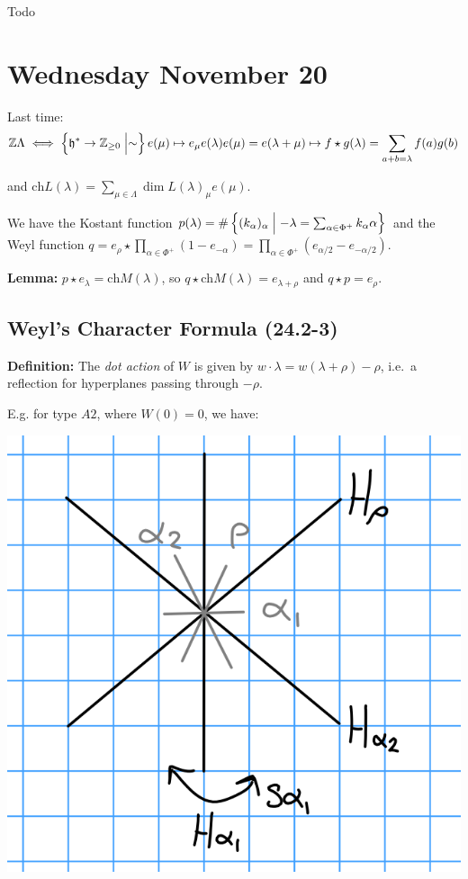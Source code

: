 Todo

\hypertarget{wednesday-november-20}{%
\section{Wednesday November 20}\label{wednesday-november-20}}

Last time: \[
{\mathbb{Z}} \Lambda \iff \left\{{ {\mathfrak{h}}^* \to {\mathbb{Z}}_{\geq 0} \mathrel{\Big|} \sim  }\right\} \\
e(\mu) \mapsto e_\mu \\
e(\lambda) e(\mu) = e(\lambda + \mu) \mapsto f \star g(\lambda) = \sum_{a+b=\lambda} f(a) g(b)
\]

and
\(\mathrm{ch} L(\lambda) = \sum_{\mu \in \Lambda} \dim L(\lambda)_\mu e(\mu)\).

We have the Kostant function
\(p(\lambda) = \# \left\{{ (k_\alpha)_\alpha \mathrel{\Big|} -\lambda = \sum_{\alpha\in\Phi^+} k_\alpha \alpha }\right\}\)
and the Weyl function
\(q = e_\rho \star \prod_{\alpha\in\Phi^+}(1 - e_{-\alpha}) = \prod_{\alpha\in\Phi^+} (e_{\alpha/2} - e_{-\alpha/2})\).

\textbf{Lemma:} \(p\star e_\lambda = \mathrm{ch} M(\lambda)\), so
\(q \star \mathrm{ch} M(\lambda) = e_{\lambda + \rho}\) and
\(q \star p = e_\rho\).

\hypertarget{weyls-character-formula-24.2-3}{%
\subsection{Weyl's Character Formula
(24.2-3)}\label{weyls-character-formula-24.2-3}}

\textbf{Definition:} The \emph{dot action} of \(W\) is given by
\(w\cdot \lambda = w(\lambda + \rho) - \rho\), i.e.~a reflection for
hyperplanes passing through \(-\rho\).

E.g. for type \(A2\), where \(W(0) = 0\), we have:

\includegraphics{figures/2019-11-20-09:19.png}\\

